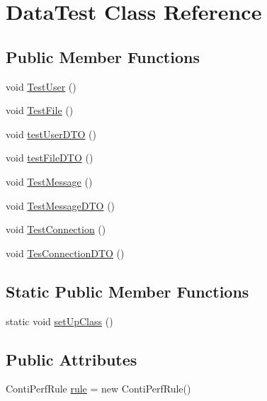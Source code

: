 \hypertarget{class_data_test}{}\section{Data\+Test Class Reference}
\label{class_data_test}
\subsection*{Public Member Functions}
\begin{DoxyCompactItemize}
\item 
void \mbox{\hyperlink{class_data_test_a7eda1ff6b6607bd45d0a6db886378a29}{Test\+User}} ()
\item 
void \mbox{\hyperlink{class_data_test_a6b44da8dd20c888a77584837d9fce555}{Test\+File}} ()
\item 
void \mbox{\hyperlink{class_data_test_a172bc3e2697560ea0ff26099e9dfd508}{test\+User\+D\+TO}} ()
\item 
void \mbox{\hyperlink{class_data_test_a8c0850346f6c9aaa3a4fabbc99a96d32}{test\+File\+D\+TO}} ()
\item 
void \mbox{\hyperlink{class_data_test_a6ed170bdf3a6b92d8d01bb98592e48fb}{Test\+Message}} ()
\item 
void \mbox{\hyperlink{class_data_test_a054c432b6518a387e0c8fa6d9b7c596e}{Test\+Message\+D\+TO}} ()
\item 
void \mbox{\hyperlink{class_data_test_abf8f108d703765985b36b26d58f18186}{Test\+Connection}} ()
\item 
void \mbox{\hyperlink{class_data_test_a7d77d6e7339b80710fc593888ae89d7a}{Tes\+Connection\+D\+TO}} ()
\end{DoxyCompactItemize}
\subsection*{Static Public Member Functions}
\begin{DoxyCompactItemize}
\item 
static void \mbox{\hyperlink{class_data_test_a4845a118091476fc9230f38fe8c975e5}{set\+Up\+Class}} ()
\end{DoxyCompactItemize}
\subsection*{Public Attributes}
\begin{DoxyCompactItemize}
\item 
Conti\+Perf\+Rule \mbox{\hyperlink{class_data_test_a50a248830efac1fc97a7c63f8220c6ce}{rule}} = new Conti\+Perf\+Rule()
\end{DoxyCompactItemize}


